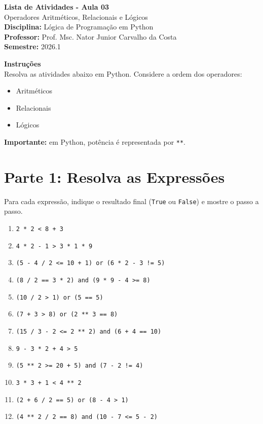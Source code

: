 \documentclass[12pt]{article}
\begin{document}
\begin{center}
{\LARGE \textbf{Lista de Atividades - Aula 03}}\\[4pt]
{\large Operadores Aritméticos, Relacionais e Lógicos}\\[10pt]
\textbf{Disciplina:} Lógica de Programação em Python\\
\textbf{Professor:} Prof. Msc. Nator Junior Carvalho da Costa\\
\textbf{Semestre:} 2026.1
\end{center}

\vspace{8pt}
\colorbox{lightbg}{%
\parbox{\dimexpr\linewidth-2\fboxsep\relax}{%
\textbf{Instruções}\\
Resolva as atividades abaixo em Python. Considere a ordem dos operadores:
\begin{itemize}
    \item Aritméticos
    \item Relacionais
    \item Lógicos
\end{itemize}
\textbf{Importante:} em Python, potência é representada por \texttt{**}.
}}

\section*{Parte 1: Resolva as Expressões}
Para cada expressão, indique o resultado final (\texttt{True} ou \texttt{False}) e mostre o passo a passo.

\begin{enumerate}
    \item \texttt{2 * 2 < 8 + 3}
    \item \texttt{4 * 2 - 1 > 3 * 1 * 9}
    \item \texttt{(5 - 4 / 2 <= 10 + 1) or (6 * 2 - 3 != 5)}
    \item \texttt{(8 / 2 == 3 * 2) and (9 * 9 - 4 >= 8)}
    \item \texttt{(10 / 2 > 1) or (5 == 5)}
    \item \texttt{(7 + 3 > 8) or (2 ** 3 == 8)}
    \item \texttt{(15 / 3 - 2 <= 2 ** 2) and (6 + 4 == 10)}
    \item \texttt{9 - 3 * 2 + 4 > 5}
    \item \texttt{(5 ** 2 >= 20 + 5) and (7 - 2 != 4)}
    \item \texttt{3 * 3 + 1 < 4 ** 2}
    \item \texttt{(2 + 6 / 2 == 5) or (8 - 4 > 1)}
    \item \texttt{(4 ** 2 / 2 == 8) and (10 - 7 <= 5 - 2)}
\end{enumerate}
\end{document}
